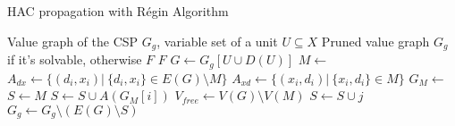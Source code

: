 \documentclass[10pt,aspectratio=43,mathserif]{beamer}
\begin{document}
    \begin{frame}[allowframebreaks]{HAC propagation with Régin Algorithm}
                \begin{algorithmic}[1]
                    \Require Value graph of the CSP $G_g$, variable set of a unit $U\subseteq X$
                    \Ensure Pruned value graph $G_g$ if it's solvable, otherwise $F$
                            \State \Return $F$
                        \EndIf
                        \State $G\gets G_g[U\cup D(U)]$ 
                        \State $M\gets$ 
                        \State $A_{dx}\gets \{(d_i,x_i)|\ \{d_i,x_i\}\in E(G)\setminus M \}$
                        \State $A_{xd}\gets \{(x_i,d_i)|\ \{x_i,d_i\}\in M\}$ 
                        \State $G_M\gets$ 
                        \State $S\gets M$
                            \State $S \gets S\cup A(G_M[i])$
                        \EndFor
                        \State $V_{free} \gets V(G)\setminus V(M)$
                             
                                    \State $S\gets S\cup j$
                                \EndFor
                            \EndFor
                        \EndIf
                        \State $G_g\gets G_g \setminus(E(G)\setminus S)$
                    \EndFunction
                \end{algorithmic}
    \end{frame}
\end{document}
